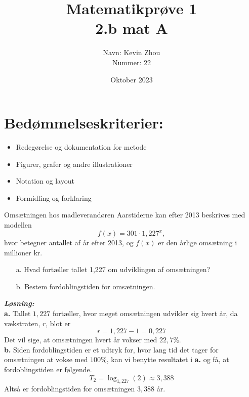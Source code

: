 \documentclass{article}
\title{Matematikprøve 1\\
{\Large \textbf{2.b mat A}}}
\author{Navn: Kevin Zhou \\ 
Nummer: 22}
\date{Oktober 2023}
\newcommand{\sol}{\setlength{\parindent}{0cm}\textbf{\textit{Løsning:}}\setlength{\parindent}{1cm}}
\begin{document}
\maketitle
\section*{Bedømmelseskriterier:}
\begin{itemize}
    \setlength\itemsep{3cm}
    \Large
    \item  Redegørelse og dokumentation for metode
    \item Figurer, grafer og andre illustrationer
    \item Notation og layout
    \item Formidling og forklaring
\end{itemize}
\pagebreak

\begin{question}{}{}
Omsætningen hos madleverandøren Aarstiderne kan efter 2013 beskrives med modellen
\[
f(x)= 301 \cdot 1,227^x,
\] 
  hvor betegner antallet af år efter 2013, og $f(x)$ er den årlige omsætning i millioner kr. 
\begin{itemize}
  \item[a.] Hvad fortæller tallet 1,227 om udviklingen af omsætningen?
  \item[b.] Bestem fordoblingstiden for omsætningen.
\end{itemize}
\end{question}
\sol \\ 
\textbf{a.} Tallet $1,227$ fortæller, hvor meget omsætningen udvikler sig hvert år, da vækstraten, $r$, blot er
\[
r=1,227-1=0,227
\] 
Det vil sige, at omsætningen hvert år vokser med $22,7 \%$.\\[1ex]
\textbf{b.} Siden fordoblingstiden er et udtryk for, hvor lang tid det tager for omsætningen at vokse med $100\%$, kan vi benytte resultatet i \textbf{a.} og få, at fordoblingstiden er følgende.
\[
T_2=\log_{1,227}(2) \approx 3,388
\] 
Altså er fordoblingstiden for omsætningen $3,388$ år. 
\end{document}
